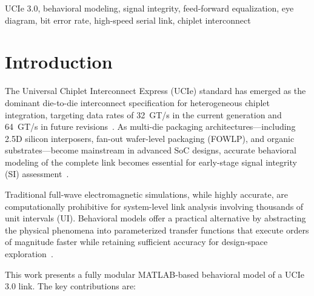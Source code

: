 \documentclass[conference]{IEEEtran}
\begin{document}
\begin{IEEEkeywords}
UCIe 3.0, behavioral modeling, signal integrity, feed-forward equalization, eye diagram, bit error rate, high-speed serial link, chiplet interconnect
\end{IEEEkeywords}

\section{Introduction}

The Universal Chiplet Interconnect Express (UCIe) standard has emerged as the dominant die-to-die interconnect specification for heterogeneous chiplet integration, targeting data rates of 32~GT/s in the current generation and 64~GT/s in future revisions~\cite{ucie_spec}. As multi-die packaging architectures---including 2.5D silicon interposers, fan-out wafer-level packaging (FOWLP), and organic substrates---become mainstream in advanced SoC designs, accurate behavioral modeling of the complete link becomes essential for early-stage signal integrity (SI) assessment~\cite{razavi2012}.

Traditional full-wave electromagnetic simulations, while highly accurate, are computationally prohibitive for system-level link analysis involving thousands of unit intervals (UI). Behavioral models offer a practical alternative by abstracting the physical phenomena into parameterized transfer functions that execute orders of magnitude faster while retaining sufficient accuracy for design-space exploration~\cite{fan2007signal}.

This work presents a fully modular MATLAB-based behavioral model of a UCIe 3.0 link. The key contributions are:
\end{document}
